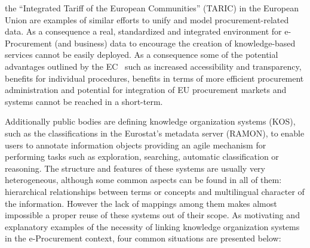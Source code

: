 the ``Integrated Tariff of the European Communities'' (TARIC) in the European Union are examples of similar efforts to unify 
and model procurement-related data. As a consequence a real, standardized and integrated environment for e-Procurement (and business) data 
to encourage the creation of knowledge-based services cannot be easily deployed. As a consequence some of the potential advantages 
outlined by the EC~\cite{d2010} such as increased accessibility and transparency, benefits for individual procedures, 
benefits in terms of more efficient procurement administration and potential for integration of EU procurement markets and systems cannot be reached in a 
short-term. 

Additionally public bodies are defining knowledge organization systems (KOS), such as the classifications in the Eurostat's metadata server (RAMON), 
to enable users to annotate information objects providing an agile mechanism for performing tasks such as exploration, searching, 
automatic classification or reasoning. The structure and features of these systems are usually very heterogeneous, 
although some common aspects can be found in all of them: hierarchical relationships between terms or concepts and multilingual character of the information. 
However the lack of mappings among them makes almost impossible a proper reuse of these systems out of their scope. As motivating and 
explanatory examples of the necessity of linking knowledge organization systems in the e-Procurement context, 
four common situations are presented below:


